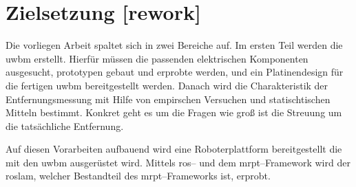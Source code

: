 \begin{comment}
------------------------------------------------------------------------------------------
\end{comment}


\begin{comment}
------------------------------------------------------------------------------------------
- Beschreiben Sie das Ziel Ihres Forschungsvorhabens.
- Was wollen Sie am Ende herausgefunden haben und weshalb?
- Welche Ziele sollen erreicht werden?
	- Aufbau von UWB Hardware
	- Testen der Out-Of-Box UWB Hardware mit einem RO-SLAM Algorithmus
\end{comment}
\section{Zielsetzung [rework]}

Die vorliegen Arbeit spaltet sich in zwei Bereiche auf. Im ersten Teil werden die uwbm erstellt. Hierfür müssen die passenden elektrischen Komponenten ausgesucht, prototypen gebaut und erprobte werden, und ein Platinendesign für die fertigen uwbm bereitgestellt werden. Danach wird die Charakteristik der Entfernungsmessung mit Hilfe von empirschen Versuchen und statischtischen Mitteln bestimmt. Konkret geht es um die Fragen wie groß ist die Streuung um die tatsächliche Entfernung.

Auf diesen Vorarbeiten aufbauend wird eine Roboterplattform bereitgestellt die mit den uwbm ausgerüstet wird. Mittels ros-- und dem mrpt--Framework wird der roslam, welcher Bestandteil des mrpt--Frameworks ist, erprobt.


\begin{comment}
------------------------------------------------------------------------------------------
- Ein weiterer interessanter Punkt sind die Abgrenzungen. Betrachtest du nur einen kleinen Problemfall aus einem großen Themenbereich kannst du in der Einleitung bereits darlegen, welche Aspekte du leider nicht berücksichtigen kannst.
\end{comment}


\begin{comment}
------------------------------------------------------------------------------------------
- Die Vorgehensweise und die Wahl der Methode sollte begründet und dargelegt werden.
\end{comment}

